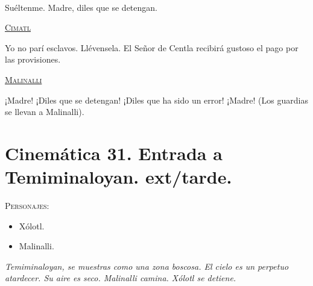 \documentclass[11pt,letterpaper]{article}
\begin{document}
\begin{center}
\\
\par
Suéltenme. Madre, diles que se detengan.
\\
\par
\textsc{\underline{Cimatl}}
\\
\par
Yo no parí esclavos. Llévensela. El Señor de Centla recibirá gustoso el pago por las provisiones.
\\
\par
\textsc{\underline{Malinalli}}
\\
\par
¡Madre! ¡Diles que se detengan! ¡Diles que ha sido un error! ¡Madre! (Los guardias se llevan a Malinalli).
\end{center}

\section{Cinemática 31. Entrada a Temiminaloyan. ext/tarde.}
 \textsc{Personajes}:
 \begin{itemize}
 \item Xólotl.
\item Malinalli.
 \end{itemize}
\textit{Temiminaloyan, se muestras como una zona boscosa. El cielo es un perpetuo atardecer. Su aire es seco. Malinalli camina. Xólotl se detiene.}
\end{document}
